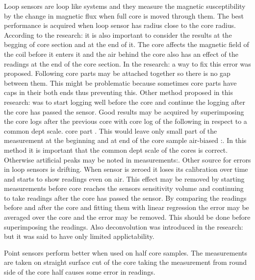\documentclass[12pt,a4paper,oneside,pdftex]{report}
\begin{document}
Loop sensors are loop like systems and they measure the magnetic susceptibility by the change in magnetic flux when full core is moved through them. 
The best performance is acquired when loop sensor has radius close to the core radius. According to the 
research\cite{Nowaczyk2001}: it is also important to consider the results at the begging of core section and at the
end of it. The core affects the magnetic field of the coil before it enters it and the air behind the core also has 
an effect of the readings at the end of the core section. In the research\cite{Nowaczyk2001}: a way to fix this 
error was proposed. Following core parts may be attached together so there is no gap between them. This might be
problematic because sometimes core parts have caps in their both ends thus preventing this. Other method proposed
in this research\cite{Nowaczyk2001}: was to start logging well before the core and continue the logging after the
core has passed the sensor. Good results may be acquired by superimposing the core logs after the previous core with
core log of the following in respect to a common dept scale.
core part . This would leave only small part of the measurement at the beginning and at
end of the core sample air-biased \cite{Nowaczyk2001}:. In this method it is important that the common dept scale
of the cores is correct. Otherwise artificial peaks may be noted in measurements\cite{Nowaczyk2001}:. Other source
for errors in loop sensors is drifting. When sensor is zeroed it loses its calibration over time and starts to 
show readings even on air. This effect may be removed by starting measurements before core reaches the sensors
sensitivity volume and continuing to take readings after the core has passed the sensor. By comparing the readings
before and after the core and fitting them with linear regression the error may be averaged over the core and the 
error may be removed. This should be done before superimposing the readings. Also deconvolution was introduced in
the research\cite{Nowaczyk2001}: but it was said to have only limited applictability.

Point sensors perform better when used on half core samples. The measurements are taken on straight surface cut of
the core taking the measurement from round side of the core half causes some error in readings. 



\end{document}
